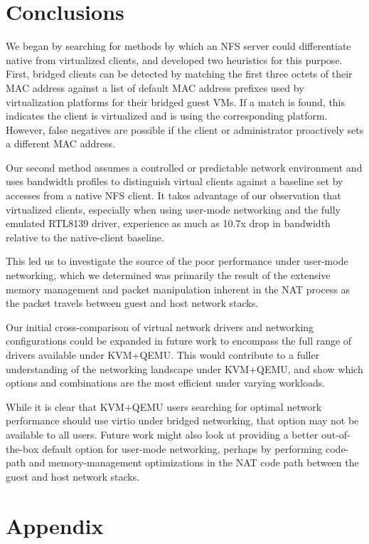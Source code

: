 \documentclass[letterpaper,twocolumn,11pt]{article}
\begin{document}
\section{Conclusions}
We began by searching for methods by which an NFS server could differentiate native from virtualized clients, and developed two heuristics for this purpose. First, bridged clients can be detected by matching the first three octets of their MAC address against a list of default MAC address prefixes used by virtualization platforms for their bridged guest VMs. If a match is found, this indicates the client is virtualized and is using the corresponding platform. However, false negatives are possible if the client or administrator proactively sets a different MAC address. 

Our second method assumes a controlled or predictable network environment and uses bandwidth profiles to distinguish virtual clients against a baseline set by accesses from a native NFS client. It takes advantage of our observation that virtualized clients, especially when using user-mode networking and the fully emulated RTL8139 driver, experience as much as 10.7x drop in bandwidth relative to the native-client baseline. 

This led us to investigate the source of the poor performance under user-mode networking, which we determined was primarily the result of the extensive memory management and packet manipulation inherent in the NAT process as the packet travels between guest and host network stacks.

Our initial cross-comparison of virtual network drivers and networking configurations could be expanded in future work to encompass the full range of drivers available under KVM+QEMU. This would contribute to a fuller understanding of the networking landscape under KVM+QEMU, and show which options and combinations are the most efficient under varying workloads. 

While it is clear that KVM+QEMU users searching for optimal network performance should use virtio under bridged networking, that option may not be available to all users. Future work might also look at providing a better out-of-the-box default option for user-mode networking, perhaps by performing code-path and memory-management optimizations in the NAT code path between the guest and host network stacks.

{\footnotesize 
}

\section*{Appendix}
\label{sec:appendix}
\end{document}
